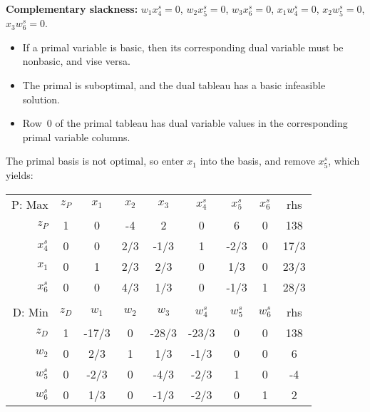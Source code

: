 \begin{solution}
{\color{red} \bf Complementary slackness:} $w_1 x^s_4=0$, $w_2 x^s_5=0$, $w_3 x^s_6=0$, $x_1 w^s_4=0$,  $x_2 w^s_5=0$, $x_3 w^s_6=0$. \\
\vspace{-2mm}\begin{itemize}
\item If a primal variable is basic, then its corresponding dual variable must be nonbasic, and vise versa.   
\item The primal is suboptimal, and the dual tableau has a basic infeasible solution.
\item Row~0 of the primal tableau has dual variable values in the corresponding primal variable columns. 
\end{itemize}

The primal basis is not optimal, so enter $x_1$ into the basis, and remove $x^s_5$, which yields:  

\begin{center} \begin{tabular} {r|c|c|c|c|c|c|c|c|} \cline{2-9} 
P: Max & $z_P$ 	& $x_1$ 	& $x_2$ 	& $x_3$ 	& $x^{s}_4$ 	& $x^{s}_5$ 	& $x^{s}_6$ 	& rhs   \\ \cline{2-9}  
$z_P$	& 1  		& 0   		& -4   	& 2   		& 0    	& 6      	& 0     	& 138   \\ \cline{2-9}  
$x^{s}_4$	& 0  		& 0     & 2/3   	& -1/3    	& 1    	& -2/3     & 0     	& 17/3  \\ \cline{2-9} 
$x_1$	& 0  		& 1     	& 2/3    	& 2/3     	& 0    	& 1/3     	& 0     	& 23/3  \\ \cline{2-9} 
$x^{s}_6$ 	& 0  		& 0     	& 4/3     	& 1/3    	& 0    	& -1/3      & 1     	& 28/3   \\ \cline{2-9}
\multicolumn{9}{c}{ } \\ \cline{2-9}
D: Min& $z_D$ 	& $w_1$ 	& $w_2$ 	& $w_3$ 	& $w^{s}_4$ 	& $w^{s}_5$ 	& $w^{s}_6$ 	& rhs   \\ \cline{2-9}   
$z_D$	& 1    	& -17/3  	& 0     	& -28/3   & -23/3   & 0    		& 0     	& 138   	\\ \cline{2-9}  
$w_2$	& 0    	& 2/3   	& 1     	& 1/3    	& -1/3 	& 0  		& 0     	& 6   \\ \cline{2-9}   
$w^{s}_5$ 	& 0    	& -2/3   	& 0    & -4/3    	& -2/3  	& 1   		& 0     	& -4   \\ \cline{2-9}   
$w^{s}_6$	& 0    	& 1/3   	& 0    & -1/3  	& -2/3  	& 0  		& 1     	& 2    \\ \cline{2-9} 
\end{tabular} \end{center}


\end{solution}
